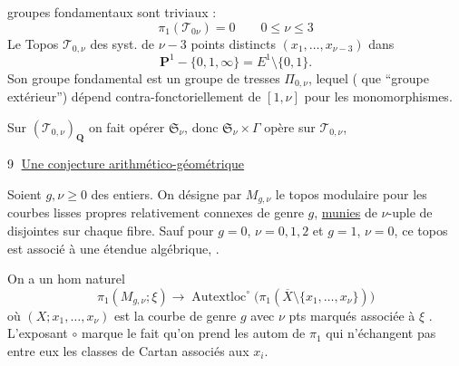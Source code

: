 groupes fondamentaux sont triviaux :
\[
\pi_1(\mathcal T_{0\nu})=0\qquad 0\leq\nu\leq3
\]
Le Topos $\mathcal T_{0,\nu}$     des syst. de $\nu-3$ points distincts $(x_1,\ldots,x_{\nu-3})$ dans
\[
\mathbf P^1-\{0,1,\infty\}=E^1\setminus\{0,1\}.
\]
Son groupe fondamental est un groupe de tresses $\Pi_{0,\nu}$, lequel ( que ``groupe extérieur'') dépend contra-fonctoriellement de $[1,\nu]$ pour les monomorphismes.

Sur $(\mathcal T_{0,\nu})_{\mathbf Q}$ on  fait opérer  $\mathfrak S_\nu$, donc $\mathfrak S_\nu\times\Gamma$ opère sur $\mathcal T_{0,\nu}$,

\textcircled{9} \uline{Une conjecture arithmético-géométrique}

Soient $g,\nu\geq0$ des entiers. On désigne par $M_{g,\nu}$ le topos modulaire  pour les courbes  lisses propres relativement connexes de genre $g$, \uline{munies} de  $\nu$-uple de  disjointes sur chaque fibre. Sauf pour $g=0$, $\nu=0,1,2$ et $g=1$, $\nu=0$, ce topos est associé à une étendue algébrique, .

On a un hom naturel 
\[
\pi_1(M_{g,\nu};\xi)\longrightarrow\operatorname{Autextloc}^{\circ}\bigl(\pi_1(\overline X\setminus\{x_1,\ldots,x_\nu\})\bigr)\tag{1}
\]
où $(X;x_1,\ldots,x_\nu)$ est la courbe  de genre $g$ avec $\nu$ pts marqués associée à $\xi$ .  L'exposant $\circ$ marque le fait qu'on prend les autom de $\pi_1$ qui n'échangent pas entre eux les classes de Cartan associés aux $x_i$.

